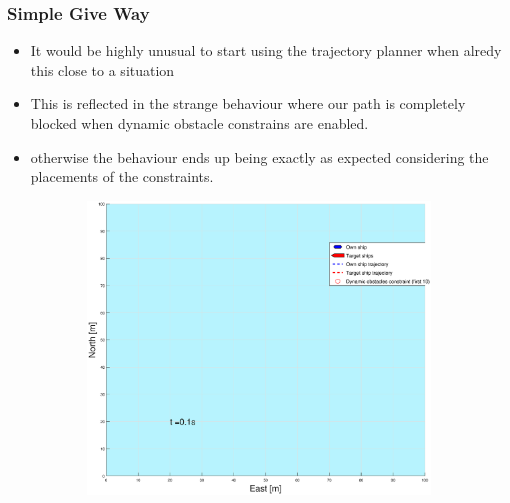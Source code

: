 \subsubsection{Simple Give Way}
\begin{itemize}
    \item It would be highly unusual to start using the trajectory planner when alredy this close to a situation
    \item This is reflected in the strange behaviour where our path is completely blocked when dynamic obstacle constrains are enabled.
    \item otherwise the behaviour ends up being exactly as expected considering the placements of the constraints.
\end{itemize}
\clearpage
\begin{figure}[!b]
    \begin{subfigure}[b]{0.49\textwidth}
        \centering
        \includegraphics[width=\textwidth]{Images/Figures/enkel_GW/_Simple_0fig1_time=0}
    \end{subfigure}
    \hfill
    \begin{subfigure}[b]{0.499\textwidth}
        \centering

\end{subfigure}
\end{figure}
